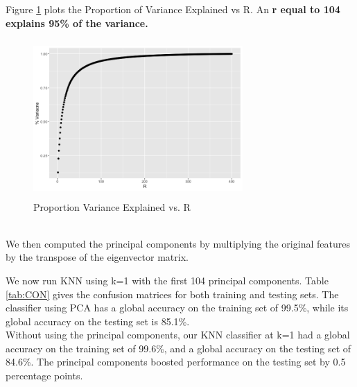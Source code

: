 \documentclass{homework}
\begin{document}
Figure \ref{fig:PVE} plots the Proportion of Variance Explained vs R. An \textbf{r equal to 104 explains 95\% of the variance.}
\begin{figure}[h]
    \centering
    \includegraphics[width=8cm,height=6cm]{graphs/PVE.png}
    \caption{Proportion Variance Explained vs. R}
    \label{fig:PVE}
\end{figure}
\\We then computed the principal components by multiplying the original features by the transpose of the eigenvector matrix. 

We now run KNN using k=1 with the first 104 principal components. Table \ref{tab:CON} gives the confusion matrices for both training and testing sets. The classifier using PCA has a global accuracy on the training set of 99.5\%, while its global accuracy on the testing set is 85.1\%.\\ Without using the principal components, our KNN classifier at k=1 had a global accuracy on the training set of 99.6\%, and a global accuracy on the testing set of 84.6\%. The principal components boosted performance on the testing set by 0.5 percentage points.

\begin{table}[h]
    \centering
    \\
    \caption{Confusion Matrix. True class is by row, Predicted class is by column}
    \label{tab:CON}
\end{table}
\end{document}
